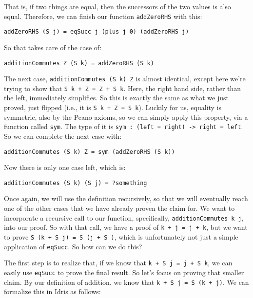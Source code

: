 \documentclass{article}
\newcommand{\inline}[1]{\texttt{#1}}
\begin{document}
That is, if two things are equal, then the successors of the two values is also equal.
Therefore, we can finish our function \inline{addZeroRHS} with this:

\begin{verbatim}
addZeroRHS (S j) = eqSucc j (plus j 0) (addZeroRHS j)
\end{verbatim}

So that takes care of the case of:

\begin{verbatim}
additionCommutes Z (S k) = addZeroRHS (S k)
\end{verbatim}

The next case, \inline{additionCommutes (S k) Z} is almost identical, except here we’re trying to show that \inline{S k + Z = Z + S k}.
Here, the right hand side, rather than the left, immediately simplifies.
So this is exactly the same as what we just proved, just flipped (i.e., it is \inline{S k + Z = S k}).
Luckily for us, equality is symmetric, also by the Peano axioms, so we can simply apply this property, via a function called \inline{sym}.
The type of it is \inline{sym : (left = right) -> right = left}.
So we can complete the next case with:

\begin{verbatim}
additionCommutes (S k) Z = sym (addZeroRHS (S k))
\end{verbatim}

Now there is only one case left, which is:

\begin{verbatim}
additionCommutes (S k) (S j) = ?something
\end{verbatim}

Once again, we will use the definition recursively, so that we will eventually reach one of the other cases that we have already proven the claim for.
We want to incorporate a recursive call to our function, specifically, \inline{additionCommutes k j}, into our proof.
So with that call, we have a proof of \inline{k + j = j + k}, but we want to prove \inline{S (k + S j) = S (j + S )}, which is unfortunately not just a simple application of \inline{eqSucc}.
So how can we do this?

The first step is to realize that, if we know that \inline{k + S j = j + S k}, we can easily use \inline{eqSucc} to prove the final result.
So let’s focus on proving that smaller claim.
By our definition of addition, we know that \inline{k + S j = S (k + j)}.
We can formalize this in Idris as follows:
\end{document}
